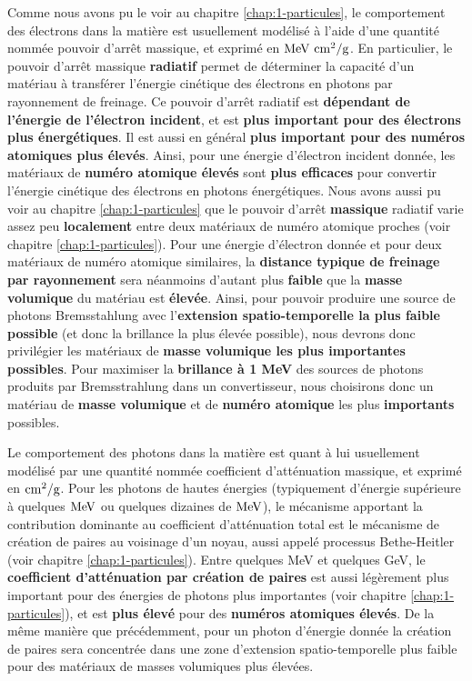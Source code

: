 \begin{refsection}
Comme nous avons pu le voir au chapitre \ref{chap:1-particules}, le comportement des électrons dans la matière est usuellement modélisé à l'aide d'une quantité nommée pouvoir d'arrêt massique, et exprimé en $\rm MeV ~ cm^2/g$. En particulier, le pouvoir d'arrêt massique \textbf{radiatif} permet de déterminer la capacité d'un matériau à transférer l'énergie cinétique des électrons en photons par rayonnement de freinage. Ce pouvoir d'arrêt radiatif est \textbf{dépendant de l'énergie de l'électron incident}, et est \textbf{plus important pour des électrons plus énergétiques}. Il est aussi en général \textbf{plus important pour des numéros atomiques plus élevés}. Ainsi, pour une énergie d'électron incident donnée, les matériaux de \textbf{numéro atomique élevés} sont \textbf{plus efficaces} pour convertir l'énergie cinétique des électrons en photons énergétiques. Nous avons aussi pu voir au chapitre \ref{chap:1-particules} que le pouvoir d'arrêt \textbf{massique} radiatif varie assez peu \textbf{localement} entre deux matériaux de numéro atomique proches (voir chapitre \ref{chap:1-particules}). Pour une énergie d'électron donnée et pour deux matériaux de numéro atomique similaires, la \textbf{distance typique de freinage par rayonnement} sera néanmoins d'autant plus \textbf{faible} que la \textbf{masse volumique} du matériau est \textbf{élevée}. Ainsi, pour pouvoir produire une source de photons Bremsstahlung avec l'\textbf{extension spatio-temporelle la plus faible possible} (et donc la brillance la plus élevée possible), nous devrons donc privilégier les matériaux de \textbf{masse volumique les plus importantes possibles}. Pour maximiser la \textbf{brillance à 1 MeV} des sources de photons produits par Bremsstrahlung dans un convertisseur, nous choisirons donc un matériau de \textbf{masse volumique} et de \textbf{numéro atomique} les plus \textbf{importants} possibles.

Le comportement des photons dans la matière est quant à lui usuellement modélisé par une quantité nommée coefficient d’atténuation massique, et exprimé en $\rm cm^2/g$. Pour les photons de hautes énergies (typiquement d'énergie supérieure à quelques $\rm MeV$ ou quelques dizaines de $\rm MeV$), le mécanisme apportant la contribution dominante au coefficient d’atténuation total est le mécanisme de création de paires au voisinage d'un noyau, aussi appelé processus Bethe-Heitler (voir chapitre \ref{chap:1-particules}). Entre quelques MeV et quelques GeV, le \textbf{coefficient d’atténuation par création de paires} est aussi légèrement plus important pour des énergies de photons plus importantes (voir chapitre \ref{chap:1-particules}), et est \textbf{plus élevé} pour des \textbf{numéros atomiques élevés}. De la même manière que précédemment, pour un photon d'énergie donnée la création de paires sera concentrée dans une zone d'extension spatio-temporelle plus faible pour des matériaux de masses volumiques plus élevées.


\end{refsection}
